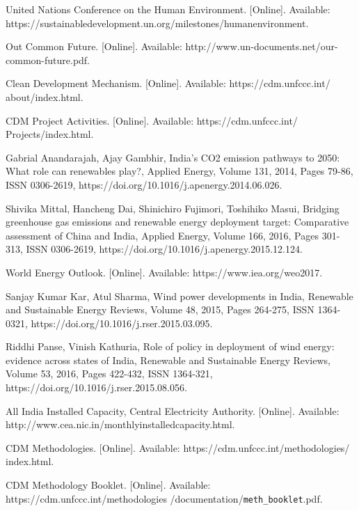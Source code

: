 \begin{thebibliography}{99}
\begin{singlespace}
 United Nations Conference on the Human Environment. [Online]. Available: https://sustainabledevelopment.un.org/milestones/humanenvironment.

 Out Common Future. [Online]. Available: http://www.un-documents.net/our-common-future.pdf.

 Clean Development Mechanism. [Online]. Available: https://cdm.unfccc.int/ about/index.html.

 CDM Project Activities. [Online]. Available: https://cdm.unfccc.int/ Projects/index.html.

 Gabrial Anandarajah, Ajay Gambhir, India’s CO2 emission pathways to 2050: What role can renewables play?, Applied Energy, Volume 131, 2014, Pages 79-86, ISSN 0306-2619, https://doi.org/10.1016/j.apenergy.2014.06.026.

 Shivika Mittal, Hancheng Dai, Shinichiro Fujimori, Toshihiko Masui, Bridging greenhouse gas emissions and renewable energy deployment target: Comparative assessment of China and India, Applied Energy, Volume 166, 2016, Pages 301-313, ISSN 0306-2619, https://doi.org/10.1016/j.apenergy.2015.12.124.

 World Energy Outlook. [Online]. Available: https://www.iea.org/weo2017.

Sanjay Kumar Kar, Atul Sharma, Wind power developments in India, Renewable and Sustainable Energy Reviews, Volume 48, 2015, Pages 264-275, ISSN 1364-0321, https://doi.org/10.1016/j.rser.2015.03.095.

 Riddhi Panse, Vinish Kathuria, Role of policy in deployment of wind energy: evidence across states of India, Renewable and Sustainable Energy Reviews, Volume 53, 2016, Pages 422-432, ISSN 1364-321,
https://doi.org/10.1016/j.rser.2015.08.056.

 All India Installed Capacity, Central Electricity Authority. [Online]. Available: http://www.cea.nic.in/monthlyinstalledcapacity.html.

 CDM Methodologies. [Online]. Available: https://cdm.unfccc.int/methodologies/ index.html.

 CDM Methodology Booklet. [Online]. Available: https://cdm.unfccc.int/methodologies /documentation/\verb|meth_booklet|.pdf.


\end{singlespace}
\end{thebibliography}
